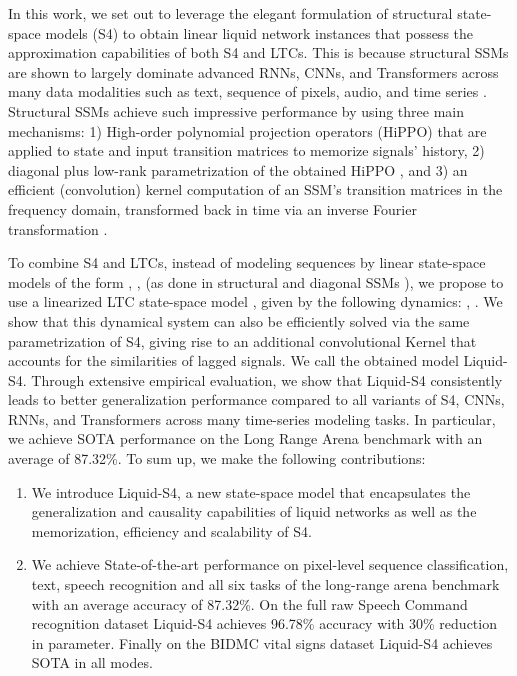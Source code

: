 \documentclass{MITcsail}
\begin{document}
In this work, we set out to leverage the elegant formulation of structural state-space models (S4) \citep{gu2022efficiently} to obtain linear liquid network instances that possess the approximation capabilities of both S4 and LTCs. This is because structural SSMs are shown to largely dominate advanced RNNs, CNNs, and Transformers across many data modalities such as text, sequence of pixels, audio, and time series \citep{gu2021combining,gu2022efficiently,gu2022parameterization,gupta2022diagonal}. Structural SSMs achieve such impressive performance by using three main mechanisms: 1) High-order polynomial projection operators (HiPPO) \citep{gu2020hippo} that are applied to state and input transition matrices to memorize signals' history, 2) diagonal plus low-rank parametrization of the obtained HiPPO \citep{gu2022efficiently}, and 3) an efficient (convolution) kernel computation of an SSM's transition matrices in the frequency domain, transformed back in time via an inverse Fourier transformation \citep{gu2022efficiently}. 

To combine S4 and LTCs, instead of modeling sequences by linear state-space models of the form , , (as done in structural and diagonal SSMs \citep{gu2022efficiently,gu2022parameterization}), we propose to use a linearized LTC state-space model \citep{hasani2021liquid}, given by the following dynamics: , . We show that this dynamical system can also be efficiently solved via the same parametrization of S4, giving rise to an additional convolutional Kernel that accounts for the similarities of lagged signals. We call the obtained model Liquid-S4. Through extensive empirical evaluation, we show that Liquid-S4 consistently leads to better generalization performance compared to all variants of S4, CNNs, RNNs, and Transformers across many time-series modeling tasks. In particular, we achieve SOTA performance on the Long Range Arena benchmark \citep{tay2020long} with an average of 87.32\%. To sum up, we make the following contributions:
\begin{enumerate}
\setlength{\itemsep}{0pt}
\setlength{\parskip}{0pt}
    \item We introduce Liquid-S4, a new state-space model that encapsulates the generalization and causality capabilities of liquid networks as well as the memorization, efficiency and scalability of S4.
    \item We achieve State-of-the-art performance on pixel-level sequence classification, text, speech recognition and all six tasks of the long-range arena benchmark with an average accuracy of 87.32\%. On the full raw Speech Command recognition dataset Liquid-S4 achieves 96.78\% accuracy with 30\% reduction in parameter. Finally on the BIDMC vital signs dataset Liquid-S4 achieves SOTA in all modes.
\end{enumerate}
\end{document}
